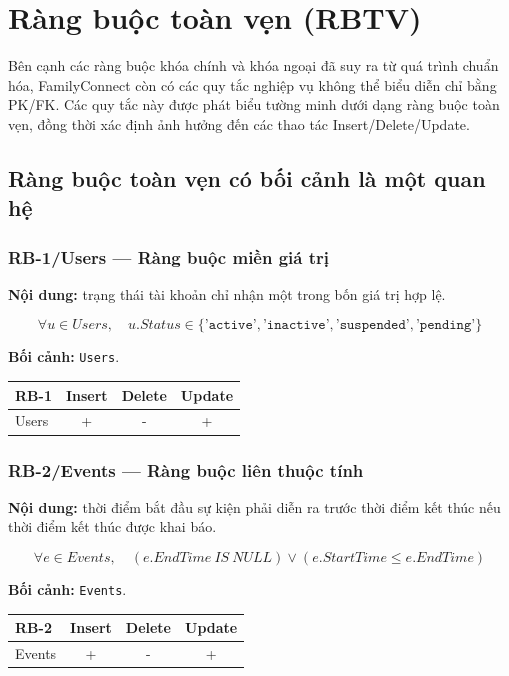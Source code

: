 \section{Ràng buộc toàn vẹn (RBTV)}

Bên cạnh các ràng buộc khóa chính và khóa ngoại đã suy ra từ quá trình chuẩn hóa, FamilyConnect còn có các quy tắc nghiệp vụ không thể biểu diễn chỉ bằng PK/FK. Các quy tắc này được phát biểu tường minh dưới dạng ràng buộc toàn vẹn, đồng thời xác định ảnh hưởng đến các thao tác Insert/Delete/Update.

\subsection{Ràng buộc toàn vẹn có bối cảnh là một quan hệ}

\subsubsection*{RB-1/Users --- Ràng buộc miền giá trị}

\textbf{Nội dung:} trạng thái tài khoản chỉ nhận một trong bốn giá trị hợp lệ.

\[
\forall u\in Users,\quad
u.Status\in\{\texttt{'active'},\texttt{'inactive'},\texttt{'suspended'},\texttt{'pending'}\}
\]

\textbf{Bối cảnh:} \texttt{Users}.

\begin{center}
\begin{tabular}{@{}lccc@{}}
\toprule
\textbf{RB-1} & \textbf{Insert} & \textbf{Delete} & \textbf{Update}\\
\midrule
Users & + & - & +\\
\bottomrule
\end{tabular}
\end{center}

\subsubsection*{RB-2/Events --- Ràng buộc liên thuộc tính}

\textbf{Nội dung:} thời điểm bắt đầu sự kiện phải diễn ra trước thời điểm kết thúc nếu thời điểm kết thúc được khai báo.

\[
\forall e\in Events,\quad
(e.EndTime\ IS\ NULL)\lor(e.StartTime\le e.EndTime)
\]

\textbf{Bối cảnh:} \texttt{Events}.

\begin{center}
\begin{tabular}{@{}lccc@{}}
\toprule
\textbf{RB-2} & \textbf{Insert} & \textbf{Delete} & \textbf{Update}\\
\midrule
Events & + & - & +\\
\bottomrule
\end{tabular}
\end{center}

